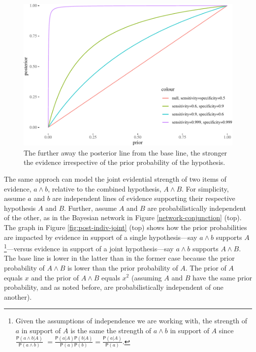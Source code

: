\documentclass[10pt,dvipsnames,enabledeprecatedfontcommands]{scrartcl}
\newcommand{\pr}[1]{\mathsf{P}(#1)}
\begin{document}
\begin{figure}


\begin{center}\includegraphics[width=0.9\linewidth]{conjunction-paradox_files/figure-latex/unnamed-chunk-12-1} \end{center}

\caption{The further away the posterior line from the base 
line, the stronger the evidence irrespective 
of the prior probability of the hypothesis.}
\label{fig:strength-prior-post}
\end{figure}

The same approch can model the joint evidential strength of two items of
evidence, \(a \wedge b\), relative to the combined hypothesis,
\(A \wedge B\). For simplicity, assume \(a\) and \(b\) are independent
lines of evidence supporting their respective hypothesis \(A\) and
\(B\). Further, assume \(A\) and \(B\) are probabilistically independent
of the other, as in the Bayesian network in Figure
\ref{network-conjunction} (top). The graph in Figure
\ref{fig:post-indiv-joint} (top) shows how the prior probabilities are
impacted by evidence in support of a single hypothesis---say
\(a\wedge b\) supports
\(A\)\footnote{Given the assumptions of independence we are working with, the strength of $a$ in support of $A$ is the same the strength of 
$a\wedge b$ in support of $A$ since $\frac{\pr{a\wedge b \vert A}}{\pr{a \wedge b}}$ $=\frac{\pr{a \vert A}\pr{b \vert A}}{\pr{a}\pr{b}}=\frac{\pr{a \vert A}}{\pr{a}}$.}---versus
evidence in support of a joint hypothesis---say \(a\wedge b\) supports
\(A \wedge B\). The base line is lower in the latter than in the former
case because the prior probability of \(A \wedge B\) is lower than the
prior probability of \(A\). The prior of \(A\) equals \(x\) and the
prior of \(A\wedge B\) equals \(x^2\) (assuming \(A\) and \(B\) have the
same prior probability, and as noted before, are probabilistically
independent of one another).
\end{document}

